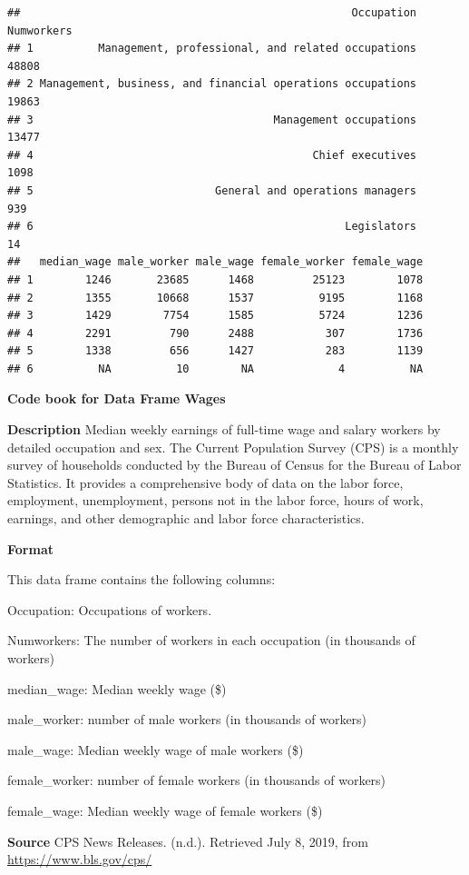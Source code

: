 \documentclass[]{book}
\begin{document}
\begin{verbatim}
##                                                   Occupation Numworkers
## 1          Management, professional, and related occupations      48808
## 2 Management, business, and financial operations occupations      19863
## 3                                     Management occupations      13477
## 4                                           Chief executives       1098
## 5                            General and operations managers        939
## 6                                                Legislators         14
##   median_wage male_worker male_wage female_worker female_wage
## 1        1246       23685      1468         25123        1078
## 2        1355       10668      1537          9195        1168
## 3        1429        7754      1585          5724        1236
## 4        2291         790      2488           307        1736
## 5        1338         656      1427           283        1139
## 6          NA          10        NA             4          NA
\end{verbatim}

\textbf{Code book for Data Frame Wages}

\textbf{Description}
Median weekly earnings of full-time wage and salary workers by detailed occupation and sex. The Current Population Survey (CPS) is a monthly survey of households conducted by the Bureau of Census for the Bureau of Labor Statistics. It provides a comprehensive body of data on the labor force, employment, unemployment, persons not in the labor force, hours of work, earnings, and other demographic and labor force characteristics.

\textbf{Format}

This data frame contains the following columns:

Occupation: Occupations of workers.

Numworkers: The number of workers in each occupation (in thousands of workers)

median\_wage: Median weekly wage (\$)

male\_worker: number of male workers (in thousands of workers)

male\_wage: Median weekly wage of male workers (\$)

female\_worker: number of female workers (in thousands of workers)

female\_wage: Median weekly wage of female workers (\$)

\textbf{Source}
CPS News Releases. (n.d.). Retrieved July 8, 2019, from \url{https://www.bls.gov/cps/}
\end{document}
